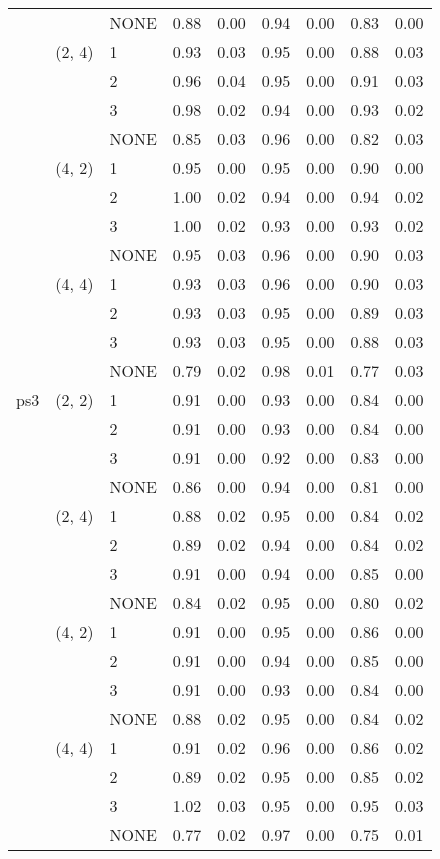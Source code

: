 \begin{tabular}{lllrrrrrr}
    &        & NONE &     0.88 & 0.00 &     0.94 & 0.00 &  0.83 & 0.00 \\
    & (2, 4) & 1 &     0.93 & 0.03 &     0.95 & 0.00 &  0.88 & 0.03 \\
    &        & 2 &     0.96 & 0.04 &     0.95 & 0.00 &  0.91 & 0.03 \\
    &        & 3 &     0.98 & 0.02 &     0.94 & 0.00 &  0.93 & 0.02 \\
    &        & NONE &     0.85 & 0.03 &     0.96 & 0.00 &  0.82 & 0.03 \\
    & (4, 2) & 1 &     0.95 & 0.00 &     0.95 & 0.00 &  0.90 & 0.00 \\
    &        & 2 &     1.00 & 0.02 &     0.94 & 0.00 &  0.94 & 0.02 \\
    &        & 3 &     1.00 & 0.02 &     0.93 & 0.00 &  0.93 & 0.02 \\
    &        & NONE &     0.95 & 0.03 &     0.96 & 0.00 &  0.90 & 0.03 \\
    & (4, 4) & 1 &     0.93 & 0.03 &     0.96 & 0.00 &  0.90 & 0.03 \\
    &        & 2 &     0.93 & 0.03 &     0.95 & 0.00 &  0.89 & 0.03 \\
    &        & 3 &     0.93 & 0.03 &     0.95 & 0.00 &  0.88 & 0.03 \\
    &        & NONE &     0.79 & 0.02 &     0.98 & 0.01 &  0.77 & 0.03 \\
ps3 & (2, 2) & 1 &     0.91 & 0.00 &     0.93 & 0.00 &  0.84 & 0.00 \\
    &        & 2 &     0.91 & 0.00 &     0.93 & 0.00 &  0.84 & 0.00 \\
    &        & 3 &     0.91 & 0.00 &     0.92 & 0.00 &  0.83 & 0.00 \\
    &        & NONE &     0.86 & 0.00 &     0.94 & 0.00 &  0.81 & 0.00 \\
    & (2, 4) & 1 &     0.88 & 0.02 &     0.95 & 0.00 &  0.84 & 0.02 \\
    &        & 2 &     0.89 & 0.02 &     0.94 & 0.00 &  0.84 & 0.02 \\
    &        & 3 &     0.91 & 0.00 &     0.94 & 0.00 &  0.85 & 0.00 \\
    &        & NONE &     0.84 & 0.02 &     0.95 & 0.00 &  0.80 & 0.02 \\
    & (4, 2) & 1 &     0.91 & 0.00 &     0.95 & 0.00 &  0.86 & 0.00 \\
    &        & 2 &     0.91 & 0.00 &     0.94 & 0.00 &  0.85 & 0.00 \\
    &        & 3 &     0.91 & 0.00 &     0.93 & 0.00 &  0.84 & 0.00 \\
    &        & NONE &     0.88 & 0.02 &     0.95 & 0.00 &  0.84 & 0.02 \\
    & (4, 4) & 1 &     0.91 & 0.02 &     0.96 & 0.00 &  0.86 & 0.02 \\
    &        & 2 &     0.89 & 0.02 &     0.95 & 0.00 &  0.85 & 0.02 \\
    &        & 3 &     1.02 & 0.03 &     0.95 & 0.00 &  0.95 & 0.03 \\
    &        & NONE &     0.77 & 0.02 &     0.97 & 0.00 &  0.75 & 0.01 \\
\bottomrule
\end{tabular}
